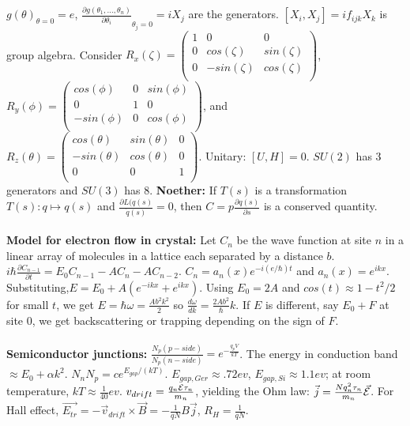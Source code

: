 $g(\theta)_{\theta=0}=e$, 
${\frac {\partial g(\theta_1 , \ldots, \theta_n)} {\partial \theta_i}}_{\theta_j=0} = i X_j$ are the
generators.  $[X_i , X_j]= i f_{ijk} X_k$ is group algebra.  Consider
$R_x(\zeta)= \left(
\begin{array}{ccc}
1 & 0 & 0 \\
0 & cos(\zeta) & sin(\zeta) \\
0 & -sin(\zeta) & cos(\zeta) \\
\end{array} 
\right)$,
$R_y(\phi)= \left(
\begin{array}{ccc}
cos(\phi) & 0 & sin(\phi) \\
0 & 1 & 0 \\
-sin(\phi) & 0 & cos(\phi) \\
\end{array} 
\right)$, and
$R_z(\theta)= \left(
\begin{array}{ccc}
cos(\theta) & sin(\theta) & 0\\
-sin(\theta) & cos(\theta) & 0 \\
0 & 0 & 1 \\
\end{array} 
\right)$.
Unitary: $[U, H]=0$.  $SU(2)$ has 3 generators and $SU(3)$ has 8.
{\bf Noether:}  If $T(s)$ is a transformation $T(s): q \mapsto q(s)$ and
${\frac {\partial L(q(s)} {{\dot q}(s)}} =0$, then $C= p{\frac {\partial q(s)} {\partial s}}$
is a conserved quantity.
\\
\\
{\bf Model for electron flow in crystal:}  Let $C_n$ be the wave function at site $n$ in a linear
array of molecules in a lattice each separated by a distance $b$.  
$i \hbar {\frac {\partial C_{n-1}} {\partial t}}=
E_0 C_{n-1} -A C_{n} -A C_{n-2}$.  $C_n= a_n(x) e^{-i (e/ \hbar)t}$ and $a_n(x)= e^{ikx}$.
Substituting,$E= E_0 + A(e^{-ikx} + e^{ikx})$.  Using $E_0= 2A$ and $cos(t) \approx 1 -t^2/2$ for
small $t$, we get $E= \hbar \omega = {\frac {A b^2 k^2} 2}$ so 
${\frac {d \omega} {dk}}={\frac {2Ab^2}{\hbar}}k$.  If $E$ is different, say $E_0+F$ at site $0$,
we get backscattering or trapping depending on the sign of $F$.
\\
\\
{\bf Semiconductor junctions:}
${\frac {N_p(p-side)} {N_p(n-side)}} = e^{-{\frac {q_p V} {kT}}}$.
The energy in conduction band $\approx E_0 + \alpha k^2$.
$N_n N_p= c e^{E_{gap}/(kT)}$.
$E_{gap, Ger} \approx .72 ev$,
$E_{gap, Si} \approx 1.1 ev$; at room temperature, $kT \approx {\frac 1 {40}} ev$.
$v_{drift}= {\frac {q_n {\cal E} \tau_n} {m_n}}$, yielding the Ohm law: 
${\vec j}= {\frac {N q_n^2 \tau_n} {m_n}} {\vec {\cal E}}$.
For Hall effect, ${\vec {E_{tr}}}= -{\vec v}_{drift} \times {\vec B}= -{\frac 1 {qN}}B{\vec j}$,
$R_H= {\frac 1 {qN}}$.
